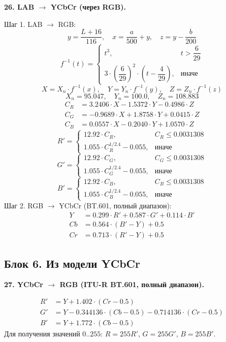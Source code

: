 \documentclass[12pt,a4paper]{article}
\begin{document}
\textbf{26. LAB \(\to\) YCbCr (через RGB).}

Шаг 1. LAB \(\to\) RGB:
\[
y = \frac{L + 16}{116},\quad x = \frac{a}{500} + y,\quad z = y - \frac{b}{200}
\]
\[
f^{-1}(t) = \begin{cases} t^3, & t > \dfrac{6}{29} \\[8pt] 3 \cdot \left( \dfrac{6}{29} \right)^2 \cdot \left( t - \dfrac{4}{29} \right), & \text{иначе} \end{cases}
\]
\[
X = X_n \cdot f^{-1}(x),\quad Y = Y_n \cdot f^{-1}(y),\quad Z = Z_n \cdot f^{-1}(z)
\]
\[
X_n = 95.047,\quad Y_n = 100.0,\quad Z_n = 108.883
\]
\begin{align*}
C_R &= 3.2406 \cdot X - 1.5372 \cdot Y - 0.4986 \cdot Z \\
C_G &= -0.9689 \cdot X + 1.8758 \cdot Y + 0.0415 \cdot Z \\
C_B &= 0.0557 \cdot X - 0.2040 \cdot Y + 1.0570 \cdot Z
\end{align*}
\[
R' = \begin{cases} 12.92 \cdot C_R, & C_R \le 0.0031308 \\[8pt] 1.055 \cdot C_R^{1/2.4} - 0.055, & \text{иначе} \end{cases}
\]
\[
G' = \begin{cases} 12.92 \cdot C_G, & C_G \le 0.0031308 \\[8pt] 1.055 \cdot C_G^{1/2.4} - 0.055, & \text{иначе} \end{cases}
\]
\[
B' = \begin{cases} 12.92 \cdot C_B, & C_B \le 0.0031308 \\[8pt] 1.055 \cdot C_B^{1/2.4} - 0.055, & \text{иначе} \end{cases}
\]
Шаг 2. RGB \(\to\) YCbCr (BT.601, полный диапазон):
\begin{align*}
Y &= 0.299 \cdot R' + 0.587 \cdot G' + 0.114 \cdot B' \\
Cb &= 0.564 \cdot (B' - Y) + 0.5 \\
Cr &= 0.713 \cdot (R' - Y) + 0.5
\end{align*}

\subsection{Блок 6. Из модели YCbCr}

\textbf{27. YCbCr \(\to\) RGB (ITU-R BT.601, полный диапазон).}

\begin{align*}
R' &= Y + 1.402 \cdot (Cr - 0.5) \\
G' &= Y - 0.344136 \cdot (Cb - 0.5) - 0.714136 \cdot (Cr - 0.5) \\
B' &= Y + 1.772 \cdot (Cb - 0.5)
\end{align*}
Для получения значений \(0..255\): \(R = 255 R'\), \(G = 255 G'\), \(B = 255 B'\).
\end{document}
